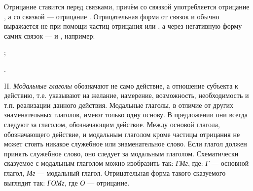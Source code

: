 Отрицание ставится перед связками, причём со связкой  употребляется отрицание , а со связкой  --- отрицание . Отрицательная форма от связок  и  обычно выражается не при помощи частиц отрицания  или , а через негативную форму самих связок ---  и , например:
\begin{prfsample}
	\item {};
	\item {}.
\end{prfsample}

II. \emph{Модальные глаголы} обозначают не само действие, а отношение субъекта к действию, т.е. указывают на желание, намерение, возможность, необходимость и т.п. реализации данного действия. Модальные глаголы, в отличие от других знаменательных глаголов, имеют только одну основу. В предложении они всегда следуют за глаголом, обозначающим действие. Между основой глагола, обозначающего действие, и модальным глаголом кроме частицы отрицания не может стоять никакое служебное или знаменательное слово. Если глагол должен принять служебное слово, оно следует за модальным глаголом. Схематически сказуемое с модальным глаголом можно изобразить так: \emph{ГМг}, где: \emph{Г} --- основной глагол, \emph{Мг} --- модальный глагол. Отрицательная форма такого сказуемого выглядит так: \emph{ГОМг}, где \emph{О} --- отрицание.

